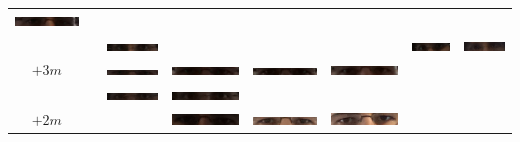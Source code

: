\begin{tabular}{|c|c|c|c|c|c|c|c|}
\includegraphics[width=0.115\linewidth]{Auge1/A_Img4-6FalkoE.png} &
\\&
&
\includegraphics[width=0.115\linewidth]{Auge1/A_Img4-2ThomasE.png} &
&
&
&
\includegraphics[width=0.115\linewidth]{Auge1/A_Img4-6ThomasE.png} &
\includegraphics[width=0.115\linewidth]{Auge1/A_Img4-7ThomasE.png} \\\hline 
$+3m$&
&
\includegraphics[width=0.115\linewidth]{Auge1/A_Img3-2FalkoE.png} &
\includegraphics[width=0.115\linewidth]{Auge1/A_Img3-3FalkoE.png} &
\includegraphics[width=0.115\linewidth]{Auge1/A_Img3-4FalkoE.png} &
\includegraphics[width=0.115\linewidth]{Auge1/A_Img3-5FalkoE.png} &
&
\\&
&
\includegraphics[width=0.115\linewidth]{Auge1/A_Img3-2ThomasE.png} &
\includegraphics[width=0.115\linewidth]{Auge1/A_Img3-3ThomasE.png} &
&
&
&
\\\hline 
$+2m$&
&
&
\includegraphics[width=0.115\linewidth]{Auge1/A_Img2-3FalkoE.png} &
\includegraphics[width=0.115\linewidth]{Auge1/A_Img2-4FalkoE.png} &
\includegraphics[width=0.115\linewidth]{Auge1/A_Img2-5FalkoE.png} &

\end{tabular}
